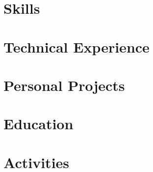 \documentclass[letter,10pt]{article}
\begin{document}


\section{Skills}


\section{Technical Experience}


\section{Personal Projects}


\section{Education}


\section{Activities}

\end{document}
